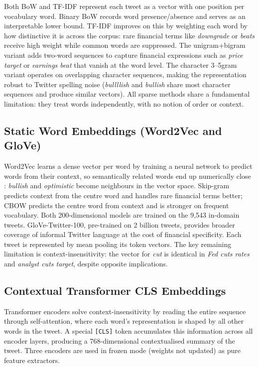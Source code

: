 \documentclass[11pt,a4paper]{article}
\begin{document}
Both BoW and TF-IDF represent each tweet as a vector with one position per vocabulary word.
Binary BoW records word presence/absence and serves as an interpretable lower bound.
TF-IDF improves on this by weighting each word by how distinctive it is across the corpus:
rare financial terms like \textit{downgrade} or \textit{beats} receive high weight while common
words are suppressed. The unigram+bigram variant adds two-word sequences to capture financial
expressions such as \textit{price target} or \textit{earnings beat} that vanish at the word
level. The character 3–5gram variant operates on overlapping character sequences, making the
representation robust to Twitter spelling noise (\textit{bullllish} and \textit{bullish} share
most character sequences and produce similar vectors). All sparse methods share a fundamental
limitation: they treat words independently, with no notion of order or context.

\subsection{Static Word Embeddings (Word2Vec and GloVe)}

Word2Vec learns a dense vector per word by training a neural network to predict words from
their context, so semantically related words end up numerically close : \textit{bullish} and
\textit{optimistic} become neighbours in the vector space. Skip-gram predicts context from the
centre word and handles rare financial terms better; CBOW predicts the centre word from context
and is stronger on frequent vocabulary. Both 200-dimensional models are trained on the 9,543
in-domain tweets. GloVe-Twitter-100, pre-trained on 2 billion tweets,
provides broader coverage of informal Twitter language at the cost of financial specificity.
Each tweet is represented by mean pooling its token vectors. The key remaining limitation is
context-insensitivity: the vector for \textit{cut} is identical in \textit{Fed cuts rates} and
\textit{analyst cuts target}, despite opposite implications.

\subsection{Contextual Transformer CLS Embeddings}

Transformer encoders solve context-insensitivity by reading the entire sequence through
self-attention, where each word's representation is shaped by all other words in the tweet.
A special \texttt{[CLS]} token accumulates this information across all encoder layers, producing
a 768-dimensional contextualised summary of the tweet. Three encoders
are used in frozen mode (weights not updated) as pure feature extractors.
\end{document}
